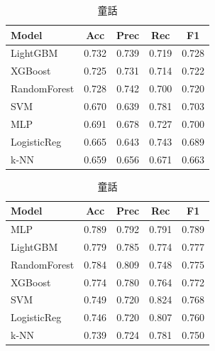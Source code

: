 \documentclass[uplatex, dvipdfmx, 11pt, a4paper, report]{jsbook}
\begin{document}
\begin{table}[H]
  \small
  \begin{minipage}[t]{0.49\textwidth}
    \centering
    \caption{パニック}
    \begin{tabular}{l|c|c|c|c} \hline
      Model & Acc & Prec & Rec & F1 \\ \hline
      LightGBM & 0.732 & 0.739 & 0.719 & 0.728 \\
      XGBoost & 0.725 & 0.731 & 0.714 & 0.722 \\
      RandomForest & 0.728 & 0.742 & 0.700 & 0.720 \\
      SVM & 0.670 & 0.639 & 0.781 & 0.703 \\
      MLP & 0.691 & 0.678 & 0.727 & 0.700 \\
      LogisticReg & 0.665 & 0.643 & 0.743 & 0.689 \\
      k-NN & 0.659 & 0.656 & 0.671 & 0.663 \\ \hline
    \end{tabular}
  \end{minipage}
  \hfill
  \begin{minipage}[t]{0.49\textwidth}
    \centering
    \caption{童話}
    \begin{tabular}{l|c|c|c|c} \hline
      Model & Acc & Prec & Rec & F1 \\ \hline
      MLP & 0.789 & 0.792 & 0.791 & 0.789 \\
      LightGBM & 0.779 & 0.785 & 0.774 & 0.777 \\
      RandomForest & 0.784 & 0.809 & 0.748 & 0.775 \\
      XGBoost & 0.774 & 0.780 & 0.764 & 0.772 \\
      SVM & 0.749 & 0.720 & 0.824 & 0.768 \\
      LogisticReg & 0.746 & 0.720 & 0.807 & 0.760 \\
      k-NN & 0.739 & 0.724 & 0.781 & 0.750 \\ \hline
    \end{tabular}
  \end{minipage}
\end{table}
\end{document}
